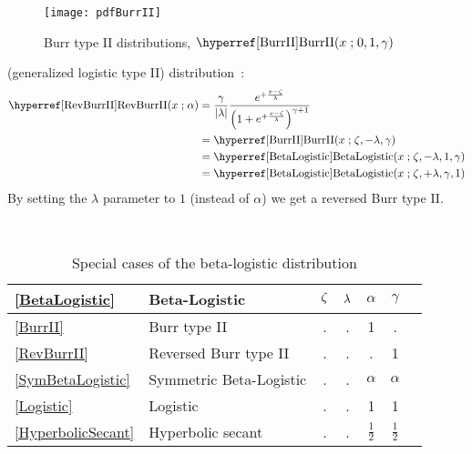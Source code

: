 \begin{figure}[t!]
\begin{center}
\texttt{[image: pdfBurrII]}
\end{center}
\caption[Burr II distributions]{Burr type II distributions, $\opr{BurrII}(x\given0,1,\gamma)$}
\end{figure}


 (generalized logistic type II) distribution~\cite{Johnson1994}:
\begin{align}
\label{RevBurrII}
\opr{RevBurrII}(x\given \alpha) 
& = \frac{\gamma}{|\pScale|}   \frac{e^{+ \frac{x-\pLoc}{\pScale} } } { \Left(1 + e^{+\frac{x-\pLoc}{\pScale}  }\Right)^{\gamma+1} }
\checked
\\
& = \opr{BurrII}(x\given \pLoc, -\pScale,  \gamma) \notag \checked \\
& = \opr{BetaLogistic}(x\given \pLoc, -\pScale, 1, \gamma) \notag \checked \\
& = \opr{BetaLogistic}(x\given \pLoc, +\pScale, \gamma, 1)  \notag \checked
\notag
\end{align}
By setting the $\lambda$ parameter to $1$ (instead of $\alpha$) we get a reversed Burr type II.


\begin{table*}[ptb]
\begin{center}
\caption[Beta-logistic distribution -- Special cases]{Special cases of the beta-logistic distribution}
~\\
{\renewcommand{\arraystretch}{1.25} 
\begin{tabular}{llccccl}
\eqref{BetaLogistic} & Beta-Logistic & $\zeta$ & $\lambda$ & $\alpha$ &  $\gamma$ \\
\hline  
\eqref{BurrII} & Burr type II					&. & . & 1 & . & \\
\eqref{RevBurrII}& Reversed Burr type II		&	. & . & . & 1 &\\
\eqref{SymBetaLogistic}& Symmetric Beta-Logistic		&	. &   . & $\alpha$ & $\alpha$ & \\
\eqref{Logistic}& Logistic					& 	. & . & 1 & 1 & \\
\eqref{HyperbolicSecant}& Hyperbolic secant	&	. & . & $\tfrac{1}{2}$ & $\tfrac{1}{2}$ & \\
\end{tabular}
}
\end{center}
\end{table*}





